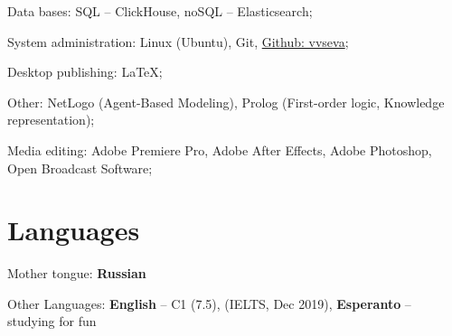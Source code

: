 \documentclass[a4paper, extended]{adcv}
\begin{document}
Data bases: SQL -- ClickHouse, noSQL -- Elasticsearch;

System administration: Linux (Ubuntu), Git, \href{https://github.com/vvseva/}{Github: vvseva};

Desktop publishing: \LaTeX;
  
Other: NetLogo (Agent-Based Modeling), Prolog (First-order logic, Knowledge representation);
  
Media editing: Adobe Premiere Pro, Adobe After Effects, Adobe Photoshop, Open Broadcast Software;
\fi

\section{Languages}

Mother tongue: \textbf{Russian} 

Other Languages: \textbf{English} -- C1 (7.5), (IELTS, Dec 2019), \textbf{Esperanto} -- studying for fun


\end{document}

